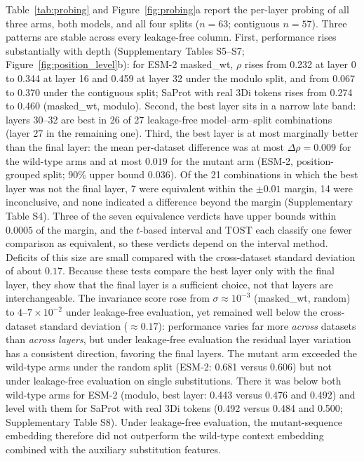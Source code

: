 \documentclass[numbered,webpdf,modern,large]{oup-authoring-template}
\newcommand{\rone}[1]{#1}
\newcommand{\rtwo}[1]{#1}
\newcommand{\rthree}[1]{#1}
\begin{document}
\rone{Table~\ref{tab:probing} and Figure~\ref{fig:probing}a report the \rtwo{per-layer
probing} of all three arms,
both models, and all four splits ($n = 63$; contiguous $n = 57$). \rtwo{Three} patterns are
stable across every leakage-free column. \rtwo{First, performance rises substantially
with depth (Supplementary Tables \rthree{S5--S7}; Figure~\ref{fig:position_level}b): for ESM-2
masked\_wt, $\rho$ rises from 0.232 at layer 0 to 0.344 at layer 16 and 0.459 at layer
32 under the modulo split, and from 0.067 to 0.370 under the contiguous split; SaProt
with real 3Di tokens rises from 0.274 to 0.460 (masked\_wt, modulo).} \rtwo{Second}, the
best layer sits in a narrow late band: layers 30--32 are best in 26 of 27
\rtwo{leakage-free} model--arm--split combinations (layer 27 in the remaining one).
\rtwo{Third, the best layer is at most marginally better than the final layer: \rthree{the mean
per-dataset difference was at most $\Delta\rho = 0.009$ for the wild-type arms and at most
$0.019$ for the mutant arm (ESM-2, position-grouped split; 90\% upper bound $0.036$). Of
the 21 combinations in which the best layer was not the final layer, 7 were equivalent
within the $\pm 0.01$ margin, 14 were inconclusive, and none indicated a difference
beyond the margin (Supplementary Table S4). Three of the seven equivalence verdicts have
upper bounds within $0.0005$ of the margin, and the $t$-based interval and TOST each
classify one fewer comparison as equivalent, so these verdicts depend on the interval
method. Deficits of this size are small compared with the cross-dataset standard
deviation of about $0.17$.} Because these tests compare the best layer only with the
final layer, they show that the final layer is a sufficient choice, not that layers
are interchangeable.} The
invariance score rose from $\sigma \approx 10^{-3}$ (masked\_wt, random) to
$4$--$7 \times 10^{-2}$ under leakage-free evaluation, yet remained well below the
cross-dataset standard deviation ($\approx 0.17$): performance varies far more
\emph{across} datasets than \emph{across layers}, but under leakage-free evaluation
the residual layer variation has a consistent direction, favoring the final layers.
\rthree{The mutant arm exceeded the wild-type arms under the random split (ESM-2:
0.681 versus 0.606) but not under leakage-free evaluation on single substitutions. There
it was below both wild-type arms for ESM-2 (modulo, best layer: 0.443 versus 0.476 and
0.492) and level with them for SaProt with real 3Di tokens (0.492 versus 0.484 and
0.500; Supplementary Table S8). Under leakage-free evaluation, the mutant-sequence
embedding therefore did not outperform the wild-type context embedding combined with
the auxiliary substitution features.}}
\end{document}
